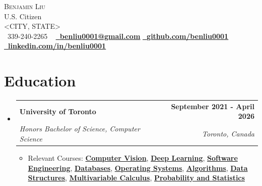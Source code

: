 \documentclass[letterpaper,11pt]{article}
\makeatletter
\let\oldhref\href
\renewcommand{\href}[2]{\oldhref{#1}{\bfseries#2}}
\newcommand{\resumeItem}[1]{
  \item\small{
    {#1 \vspace{-2pt}}
  }
}
\newcommand{\resumeSubheading}[4]{
  \vspace{-2pt}\item
    \begin{tabular*}{1.0\textwidth}[t]{l@{\extracolsep{\fill}}r}
      \textbf{#1} & \textbf{\small #2} \\
      \textit{\small#3} & \textit{\small #4} \\
    \end{tabular*}\vspace{-7pt}
}
\newcommand{\resumeSubHeadingListStart}{\begin{itemize}[leftmargin=0.0in, label={}]}
\newcommand{\resumeSubHeadingListEnd}{\end{itemize}}
\newcommand{\resumeItemListStart}{\begin{itemize}}
\newcommand{\resumeItemListEnd}{\end{itemize}\vspace{-5pt}}
\makeatother
\begin{document}

\begin{center}
    {\Huge \scshape Benjamin Liu} \\ \vspace{1pt}
    U.S. Citizen \\ \vspace{1pt}
    <CITY, STATE> \\ \vspace{1pt}
    \small \raisebox{-0.1\height}\faPhone\ 339-240-2265 ~ \href{mailto:benliu0001@gmail.com}{\raisebox{-0.2\height} \faEnvelope\  \underline{benliu0001@gmail.com}} \href{https://github.com/benliu0001}{\raisebox{-0.2\height}\faGithub\ \underline{github.com/benliu0001}} \href{https://www.linkedin.com/in/benliu0001/}{\raisebox{-0.2\height}\faLinkedin\ \underline{linkedin.com/in/benliu0001}} \\ 
    \vspace{-8pt}
\end{center}


\section{Education}
  \resumeSubHeadingListStart
    \resumeSubheading
      {University of Toronto}{September 2021 - April 2026}
      {Honors Bachelor of Science, Computer Science}{Toronto, Canada}
      \resumeItemListStart
        \resumeItem{Relevant Courses: \href{https://artsci.calendar.utoronto.ca/course/csc420h1}{Computer Vision}, \href{https://artsci.calendar.utoronto.ca/course/csc413h1}{Deep Learning}, \href{https://artsci.calendar.utoronto.ca/course/csc301h1}{Software Engineering}, \href{https://artsci.calendar.utoronto.ca/course/csc343h1}{Databases}, \href{https://artsci.calendar.utoronto.ca/course/csc369h1}{Operating Systems}, \href{https://artsci.calendar.utoronto.ca/course/csc373h1}{Algorithms}, \href{https://artsci.calendar.utoronto.ca/course/csc263h1}{Data Structures}, \href{https://artsci.calendar.utoronto.ca/course/mat237h1}{Multivariable Calculus}, \href{https://artsci.calendar.utoronto.ca/course/sta247h1}{Probability and Statistics}}
      \resumeItemListEnd
  \resumeSubHeadingListEnd
  \vspace{-14 pt}
\end{document}
